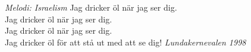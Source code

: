 {\footnotesize\textit{Melodi: Israelism}}
\vspace{10pt}
Jag dricker öl när jag ser dig.\\
Jag dricker öl när jag ser dig.\\
Jag dricker öl när jag ser dig.\\
Jag dricker öl för att stå ut med att se dig!
\vspace{10pt}
{\footnotesize\textit{Lundakernevalen 1998}}
